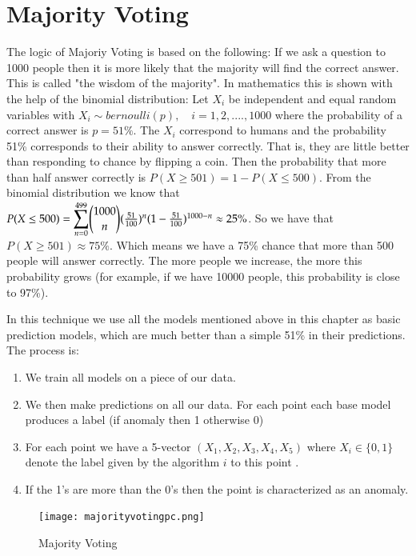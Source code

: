 \documentclass[a4paper,12pt]{report}
\theoremstyle{definitionNODot}
\begin{document}
	\section{Majority Voting}
	The logic of Majoriy Voting is based on the following: If we ask a question to 1000 people then it is more likely that the majority will find the correct answer. This is called "the wisdom of the majority". In mathematics this is shown with the help of the binomial distribution: Let $X_i$ be independent and equal random variables with $ X_i \sim bernoulli(p), \quad i=1,2,....,1000$ where the probability of a correct answer is $ p=51\% $. The $X_i$ correspond to humans and the probability 51\% corresponds to their ability to answer correctly. That is, they are little better than responding to chance by flipping a coin. Then the probability that more than half answer correctly is $P(X\geq501) = 1-P(X\leq500)$. From the binomial distribution we know that $P(X\leq500) = \mathlarger{\sum\limits_{n=0}^{499}} \mathlarger{\binom{\mathlarger{1000}}{\mathlarger{n}} } (\frac{51}{100})^n(1-\frac{51}{100})^{1000-n} \approx 25\%$. So we have that $P(X\geq 501)\approx75\%$. Which means we have a 75\% chance that more than 500 people will answer correctly. The more people we increase, the more this probability grows (for example, if we have 10000 people, this probability is close to 97\%).
	
	In this technique we use all the models mentioned above in this chapter as basic prediction models, which are much better than a simple 51\% in their predictions. The process is:
	
	\begin{enumerate}
		\item We train all models on a piece of our data.
		\item We then make predictions on all our data. For each point each base model produces a label (if anomaly then 1 otherwise 0)
		\item For each point we have a 5-vector $(X_1, X_2, X_3, X_4, X_5)$ where $X_i \in \{0,1\}$ denote the label given by the algorithm $i$ to this point .
		\item If the 1's are more than the 0's then the point is characterized as an anomaly.
	\end{enumerate}

	\begin{figure}[h]
		\centering
		\texttt{[image: majorityvotingpc.png]}
		\caption{Majority Voting}
		\label{fig:majorityvotingpc}
	\end{figure}
\end{document}
